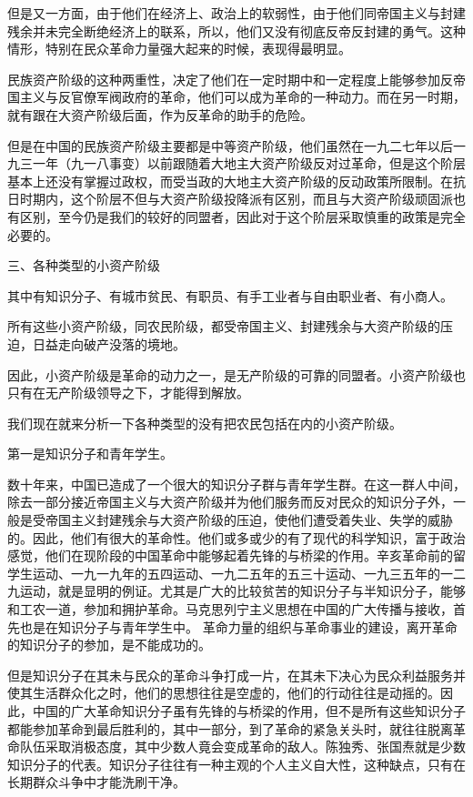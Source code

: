 \documentclass[UTF8, 12pt, a4paper]{ctexrep}
\begin{document}
但是又一方面，由于他们在经济上、政治上的软弱性，由于他们同帝国主义与封建残余并未完全断绝经济上的联系，所以，他们又没有彻底反帝反封建的勇气。这种情形，特别在民众革命力量强大起来的时候，表现得最明显。

民族资产阶级的这种两重性，决定了他们在一定时期中和一定程度上能够参加反帝国主义与反官僚军阀政府的革命，他们可以成为革命的一种动力。而在另一时期，就有跟在大资产阶级后面，作为反革命的助手的危险。

但是在中国的民族资产阶级主要都是中等资产阶级，他们虽然在一九二七年以后一九三一年（九一八事变）以前跟随着大地主大资产阶级反对过革命，但是这个阶层基本上还没有掌握过政权，而受当政的大地主大资产阶级的反动政策所限制。在抗日时期内，这个阶层不但与大资产阶级投降派有区别，而且与大资产阶级顽固派也有区别，至今仍是我们的较好的同盟者，因此对于这个阶层采取慎重的政策是完全必要的。

三、各种类型的小资产阶级

其中有知识分子、有城市贫民、有职员、有手工业者与自由职业者、有小商人。

所有这些小资产阶级，同农民阶级，都受帝国主义、封建残余与大资产阶级的压迫，日益走向破产没落的境地。

因此，小资产阶级是革命的动力之一，是无产阶级的可靠的同盟者。小资产阶级也只有在无产阶级领导之下，才能得到解放。

我们现在就来分析一下各种类型的没有把农民包括在内的小资产阶级。

第一是知识分子和青年学生。

数十年来，中国已造成了一个很大的知识分子群与青年学生群。在这一群人中间，除去一部分接近帝国主义与大资产阶级并为他们服务而反对民众的知识分子外，一般是受帝国主义封建残余与大资产阶级的压迫，使他们遭受着失业、失学的威胁的。因此，他们有很大的革命性。他们或多或少的有了现代的科学知识，富于政治感觉，他们在现阶段的中国革命中能够起着先锋的与桥梁的作用。辛亥革命前的留学生运动、一九一九年的五四运动、一九二五年的五三十运动、一九三五年的一二九运动，就是显明的例证。尤其是广大的比较贫苦的知识分子与半知识分子，能够和工农一道，参加和拥护革命。马克思列宁主义思想在中国的广大传播与接收，首先也是在知识分子与青年学生中。 革命力量的组织与革命事业的建设，离开革命的知识分子的参加，是不能成功的。

但是知识分子在其未与民众的革命斗争打成一片，在其未下决心为民众利益服务并使其生活群众化之时，他们的思想往往是空虚的，他们的行动往往是动摇的。因此，中国的广大革命知识分子虽有先锋的与桥梁的作用，但不是所有这些知识分子都能参加革命到最后胜利的，其中一部分，到了革命的紧急关头时，就往往脱离革命队伍采取消极态度，其中少数人竟会变成革命的敌人。陈独秀、张国焘就是少数知识分子的代表。知识分子往往有一种主观的个人主义自大性，这种缺点，只有在长期群众斗争中才能洗刷干净。
\end{document}
